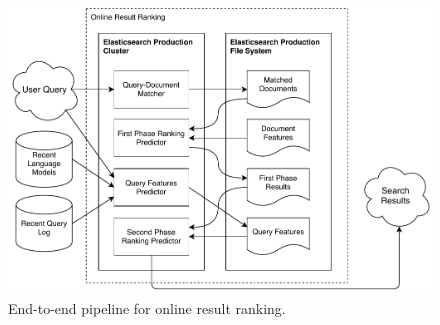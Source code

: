 \begin{figure}
  \centering
  \includegraphics[width=\linewidth]{img/online.pdf}
  \caption{End-to-end pipeline for online result ranking.}
  \label{fig:online}
\end{figure}